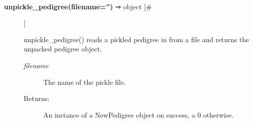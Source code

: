 \documentclass[10pt]{article}
\begin{document}
\begin{description}
\begin{description}
\end{description}
\\ 

\item[\textbf{unpickle\_pedigree(filename='')}
 ⇒ object [\#]]

 unpickle\_pedigree() reads a pickled pedigree in from a file and returns the unpacked pedigree object.
\begin{description}
\item[\emph{filename}
] The name of the pickle file.
\item[Returns:] An instance of a NewPedigree object on success, a 0 otherwise.

\end{description}
\\ 


\end{description}
\end{document}

